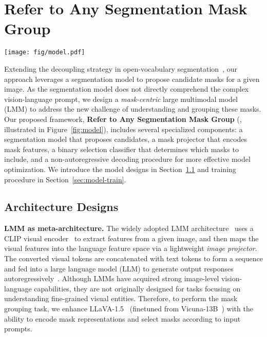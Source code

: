 \section{Refer to Any Segmentation Mask Group}
\label{sec:model}

\begin{figure*}[ht]
    \centering
    \vspace{-2mm}
    \texttt{[image: fig/model.pdf]}
    \caption{\textbf{Overview of our Refer to Any Segmentation Mask Group (\ourmodel) framework.} We extend LLaVA-1.5~\cite{liu2024improved} with a segmentation model, a visual encoder ensemble, mask tokenization, and a binary selection classifier for mask grouping. The decoding procedure of the LLM is non-autoregressive~\cite{carion2020end}, as the input tokens are given as candidate mask tokens rather than predicted from previous tokens.}
    \label{fig:model}
    \vspace{-2mm}
\end{figure*}

Extending the decoupling strategy in open-vocabulary segmentation~\cite{liang2023open, han2023open, yu2024towards}, our approach leverages a segmentation model to propose candidate masks for a given image. As the segmentation model does not directly comprehend the complex vision-language prompt, we design a \emph{mask-centric} large multimodal model (LMM) to address the new challenge of understanding and grouping these masks. Our proposed framework, \textbf{Refer to Any Segmentation Mask Group} (\textbf{\ourmodel}, illustrated in Figure~\ref{fig:model}), includes several specialized components: a segmentation model that proposes candidates, a mask projector that encodes mask features, a binary selection classifier that determines which masks to include, and a non-autoregressive decoding procedure for more effective model optimization.
We introduce the model designs in Section~\ref{sec:model-arch} and training procedure in Section~\ref{sec:model-train}.

\subsection{Architecture Designs}
\label{sec:model-arch}

\noindent\textbf{LMM as meta-architecture.} The widely adopted LMM architecture~\cite{liu2023visual} uses a CLIP visual encoder~\cite{radford2021learning} to extract features from a given image, and then maps the visual features into the language feature space via a lightweight \emph{image projector}. The converted visual tokens are concatenated with text tokens to form a sequence and fed into a large language model (LLM) to generate output responses autoregressively~\cite{radford2018improving}. Although LMMs have acquired strong image-level vision-language capabilities, they are not originally designed for tasks focusing on understanding fine-grained visual entities. Therefore, to perform the mask grouping task, we enhance LLaVA-1.5~\cite{liu2024improved} (finetuned from Vicuna-13B~\cite{vicuna2023}) with the ability to encode mask representations and select masks according to input prompts.


